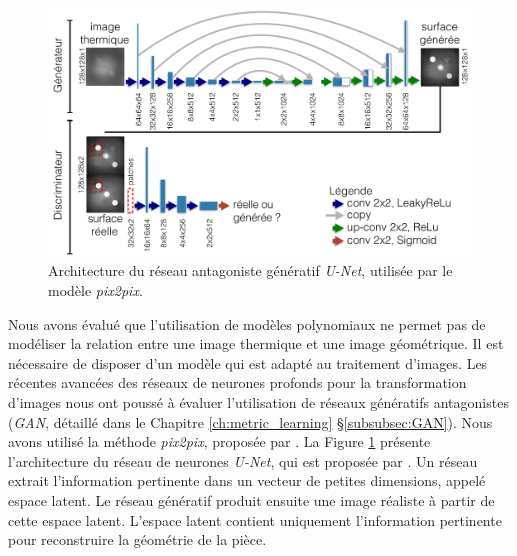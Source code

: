 \begin{figure}[tbp]
	\centering
	\includegraphics[width=\textwidth]{../Chap2/Figures/U-Net-architecture-JDD2018.pdf}
	\caption{Architecture du réseau antagoniste génératif \textit{U-Net}, utilisée par le modèle \textit{pix2pix}.}
	\label{fig:pix2pix}
\end{figure}

Nous avons évalué que l'utilisation de modèles polynomiaux ne permet pas de modéliser la relation entre une image thermique et une image géométrique.
Il est nécessaire de disposer d'un modèle qui est adapté au traitement d'images.
Les récentes avancées des réseaux de neurones profonds pour la transformation d'images nous ont poussé à évaluer l'utilisation de réseaux génératifs antagonistes (\textit{GAN}, détaillé dans le Chapitre \ref{ch:metric_learning} §\ref{subsubsec:GAN}).
Nous avons utilisé la méthode \textit{pix2pix}, proposée par \citeauthor{zhu_unpaired_2017} \cite{zhu_unpaired_2017}.
La Figure \ref{fig:pix2pix} présente l'architecture du réseau de neurones \textit{U-Net}, qui est proposée par \citeauthor{ronneberger_unet_2015} \cite{ronneberger_unet_2015}.
Un réseau extrait l'information pertinente dans un vecteur de petites dimensions, appelé espace latent.
Le réseau génératif produit ensuite une image réaliste à partir de cette espace latent.
L'espace latent contient uniquement l'information pertinente pour reconstruire la géométrie de la pièce.

